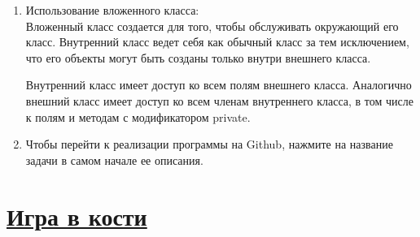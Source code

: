 \documentclass[a4paper]{article}
\begin{document}
\begin{enumerate}
    \item Использование вложенного класса:
    \\
    Вложенный класс создается для того, чтобы обслуживать окружающий его класс. 
    Внутренний класс ведет себя как обычный класс за тем исключением, что его объекты могут быть созданы только внутри внешнего класса.

    Внутренний класс имеет доступ ко всем полям внешнего класса. Аналогично внешний класс имеет доступ ко всем членам внутреннего класса, в том числе к полям и методам с модификатором private.

    \item Чтобы перейти к реализации программы на Github, нажмите на название задачи в самом начале ее описания.
    
    

    
\end{enumerate}

\section{\href{https://github.com/julproh/5_sem/tree/main/NetCracker/Java_Basics_and_OOP/first_task/bones}{Игра в кости}} 
\end{document}
